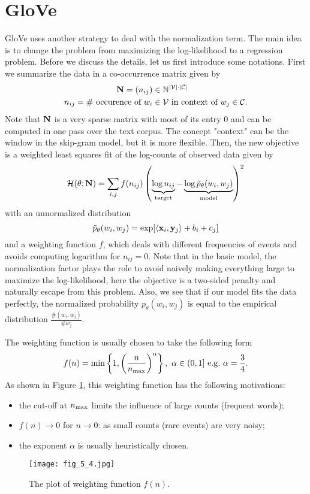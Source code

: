 \documentclass[../main.tex]{subfiles}
\begin{document}
\section{GloVe}\label{sec_5_glove}
GloVe uses another strategy to deal with the normalization term. The main idea is to change the problem from maximizing the log-likelihood to a regression problem. Before we discuss the details, let us first introduce some notations. First we summarize the data in a co-occurrence matrix given by
\begin{align*}
{\bf N}=(n_{ij})&\in \mathbb{N}^{|\mathcal{V}|\cdot |\mathcal{C}|}\\
n_{ij} = \text{\# occurence of }w_{i}&\in\mathcal{V}\text{ in context of }w_j\in \mathcal{C}.
\end{align*}
Note that ${\bf N}$ is a very sparse matrix with most of its entry $0$ and can be computed in one pass over the text corpus. The concept "context" can be the window in the skip-gram model, but it is more flexible. Then, the new objective is a weighted least squares fit of the log-counts of observed data given by
\begin{equation}\label{eq_5_glv_obj}
\mathcal{H}(\theta;{\bf N})=\sum_{i,j}f(n_{ij})\left(\underbrace{\log n_{ij}}_{\text{target}}-\underbrace{\log \tilde{p}_\theta(w_i,w_j)}_{\text{model}}\right)^2
\end{equation}
with an unnormalized distribution
\begin{equation*}
\tilde{p}_{\theta}(w_i,w_j)=\exp[\langle {\bf x}_i,{\bf y}_j\rangle +b_i+c_j]
\end{equation*}
and a weighting function $f$, which deals with different frequencies of events and avoids computing logarithm for $n_{ij}=0$. Note that in the basic model, the normalization factor plays the role to avoid naively making everything large to maximize the log-likelihood, here the objective is a two-sided penalty and naturally escape from this problem. Also, we see that if our model fits the data perfectly, the normalized probability $p_{\theta}(w_i,w_j)$ is equal to the empirical distribution $\frac{\# (w_i,w_j)}{\# w_j}$.
\par The weighting function is usually chosen to take the following form
\begin{equation*}
f(n)={\rm min}\left\{1,\left(\frac{n}{n_{\rm max}}\right)^{\alpha}\right\},\ \alpha\in (0,1]\ {\rm e.g.}\ \alpha=\frac{3}{4}.
\end{equation*}
As shown in Figure \ref{fig_5_4}, this weighting function has the following motivations:
\begin{itemize}
	\item the cut-off at $n_{\rm max}$ limits the influence of large counts (frequent words);
	\item $f(n)\rightarrow 0$ for $n\rightarrow 0$: as small counts (rare events) are very noisy;
	\item the exponent $\alpha$ is usually heuristically chosen.
\end{itemize}
\begin{figure}[h] 
	\centering 
	\texttt{[image: fig\_5\_4.jpg]} 
	\caption{The plot of weighting function $f(n)$.}\label{fig_5_4}
\end{figure}
\end{document}
